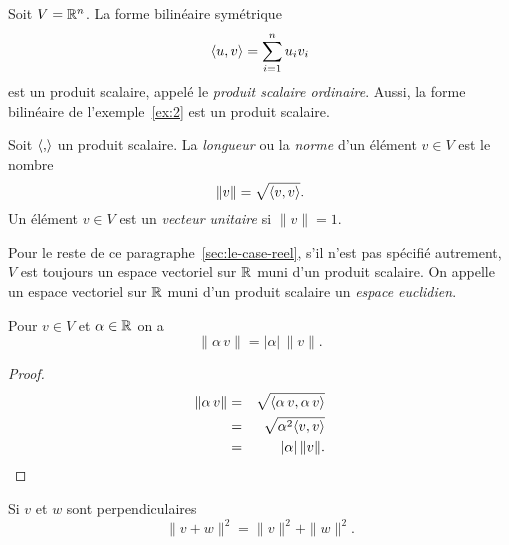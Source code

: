 \begin{example}
  \label{exe:3}
  Soit $V = \mathbb{R}^n$. La forme bilinéaire symétrique
  \begin{displaymath}
    \langle {u,v} \rangle = \sum_{i=1}^n u_iv_i 
  \end{displaymath}
  est un produit scalaire, appelé le \emph{produit scalaire ordinaire}. 
  Aussi, la forme bilinéaire  de l'exemple~\ref{ex:2} est un produit scalaire. 
\end{example}

\begin{definition}
  \label{def:5}
  Soit $\langle {,} \rangle$ un produit scalaire. La \emph{longueur} ou la \emph{norme} d'un élément $v \in V$ est le nombre 
  \begin{displaymath}
    \| v \| = \sqrt{\langle {v,v} \rangle}.
  \end{displaymath}
  Un élément $v \in V$ est un \emph{vecteur unitaire} si $\|v\| = 1$. 
\end{definition}


\begin{framed}\noindent 
  Pour le reste de ce paragraphe~\ref{sec:le-case-reel}, s'il n'est pas spécifié autrement,  $V$
  est toujours un espace vectoriel sur $\mathbb{R}$
  muni d'un produit scalaire. 
On appelle un  espace vectoriel sur $\mathbb{R}$ muni d'un produit scalaire  un \emph{espace euclidien}.  
\end{framed}



\begin{proposition}
  \label{prop:2}
  Pour $v \in V$ et $\alpha \in \mathbb{R}$ on a
  \begin{displaymath}
    \| \alpha \,v \| = |\alpha| \, \|v\|. 
  \end{displaymath}
\end{proposition}



\begin{proof}
  \begin{eqnarray*}    
   \| \alpha \,v \| & = &  \sqrt{\langle {\alpha \, v, \alpha \, v} \rangle } \\
                    & = & \sqrt{\alpha^2 \langle {v,v} \rangle} \\
                    & = & |\alpha | \, \|v\|. 
  \end{eqnarray*}
\end{proof}

\begin{proposition}
\label{prop:4}
Si $v$ et $w$ sont perpendiculaires 
\begin{displaymath}
  \|v+w\|^2 = \|v\|^2 + \|w\|^2. 
\end{displaymath}  
\end{proposition}


